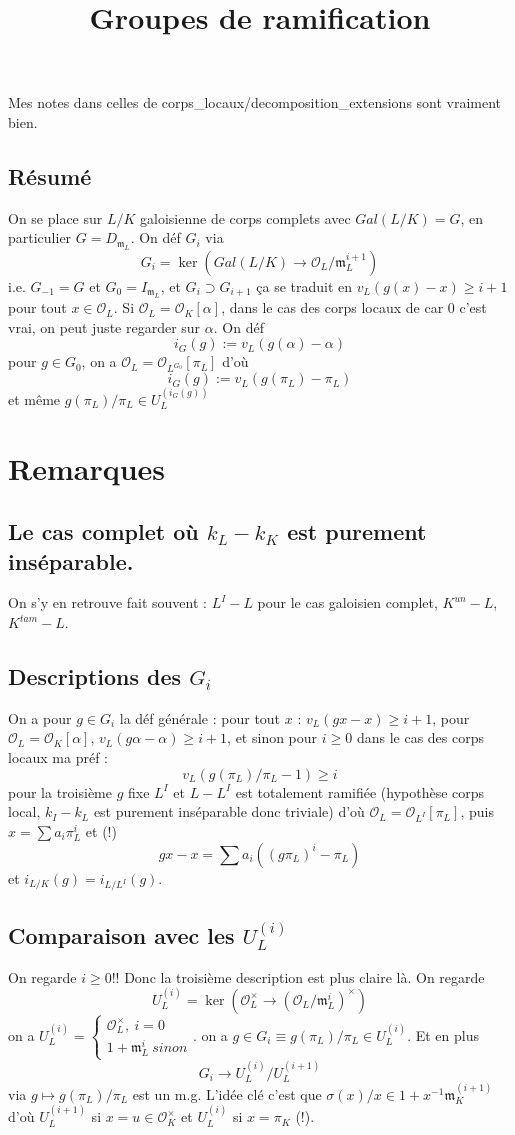 \documentclass[a4paper,12pt]{book}
\title{Groupes de ramification}
\date{}
\newcommand{\Or}{\mathcal{O}}
\newcommand{\m}{\mathfrak m}
\theoremstyle{plain}
\theoremstyle{definition}
\theoremstyle{remark}
\begin{document}
\maketitle
Mes notes dans celles de corps\_locaux/decomposition\_extensions
sont vraiment bien. 

\section{Résumé}
On se place sur $L/K$ galoisienne de corps complets avec 
$Gal(L/K)=G$, en particulier $G=D_{\m_L}$. On déf $G_i$ via 
\[G_i=\ker(Gal(L/K)\to \Or_L/\m_L^{i+1})\]
i.e. $G_{-1}=G$ et $G_0=I_{\m_L}$, et $G_i\supset G_{i+1}$ ça se
traduit en
$v_L(g(x)-x)\geq i+1$ pour tout $x\in \Or_L$. Si
$\Or_L=\Or_K[\alpha]$, dans le cas des corps locaux de car $0$ 
c'est vrai, on peut juste regarder sur $\alpha$. On déf
\[i_G(g):=v_L(g(\alpha)-\alpha)\]
pour $g\in G_0$, on a $\Or_L=\Or_{L^{G_0}}[\pi_L]$ d'où 
\[i_G(g):=v_L(g(\pi_L)-\pi_L)\]
et même $g(\pi_L)/\pi_L\in U_L^{(i_G(g))}$


\chapter{Remarques}
\section{Le cas complet où $k_L-k_K$ est purement inséparable.}
On s'y en retrouve fait souvent : $L^I-L$ pour le cas galoisien
complet, $K^{un}-L$, $K^{tam}-L$. 
\section{Descriptions des $G_i$}
On a pour $g\in G_i$ la déf générale : pour tout $x$ : 
$v_L(gx-x)\geq i+1$, pour $\Or_L=\Or_K[\alpha]$, 
$v_L(g\alpha-\alpha)\geq i+1 $, et sinon pour $i\geq 0$ dans
le cas des corps locaux ma préf :
\[v_L(g(\pi_L)/\pi_L-1)\geq i\]
pour la troisième $g$ fixe $L^I$ et $L-L^I$ est totalement ramifiée
(hypothèse corps local, $k_I-k_L$ est purement inséparable donc
triviale) d'où $\Or_L=\Or_{L^I}[\pi_L]$, puis $x=\sum a_i\pi_L^i$
et (!)
\[gx-x=\sum a_i((g\pi_L)^i -\pi_L)\]
et $i_{L/K}(g)=i_{L/L^I}(g)$.

\section{Comparaison avec les $U_L^{(i)}$}
On regarde $i\geq 0$!!
Donc la troisième description est plus claire là. On regarde 
\[U_L^{(i)}=\ker(\Or_L^\times\to (\Or_L/\m_L^i)^\times)\]
on a 
$U_L^{(i)}=\begin{cases} \Or_L^\times,~i=0\\ 1+\m_L^i~sinon\end{cases}$.
on a $g\in G_i\equiv g(\pi_L)/\pi_L\in U_L^{(i)}$. Et en plus
\[G_i\to U_L^{(i)}/U_L^{(i+1)}\]
via $g\mapsto g(\pi_L)/\pi_L$ est un m.g. L'idée clé c'est que
$\sigma(x)/x\in 1+x^{-1}\m_K^{(i+1)}$ d'où $U_L^{(i+1)}$ si
$x=u\in \Or_K^\times$ et $U_L^{(i)}$ si $x=\pi_K$ (!).
\end{document}
